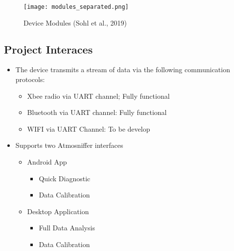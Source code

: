 \begin{figure}[h]
\centering
\texttt{[image: modules\_separated.png]}
 \caption{Device Modules (Sohl et al., 2019)}
 \label{fig:device_modules}
\end{figure}

\newpage \subsection{Project Interaces}
\begin{itemize}
\item The device transmits a stream of data via the following communication protocols:
	\begin{itemize}
	\item Xbee radio via UART channel; Fully functional
	\item Bluetooth via UART channel: Fully functional
	\item WIFI via UART Channel: To be develop
	\end{itemize}
\item Supports two Atmosniffer interfaces
	\begin{itemize}
	\item Android App
		\begin{itemize}
		\item Quick Diagnostic
		\item Data Calibration
		\end{itemize}
	\item Desktop Application
		\begin{itemize}
		\item Full Data Analysis
		\item Data Calibration
		\end{itemize}
	\end{itemize}
\end{itemize}
